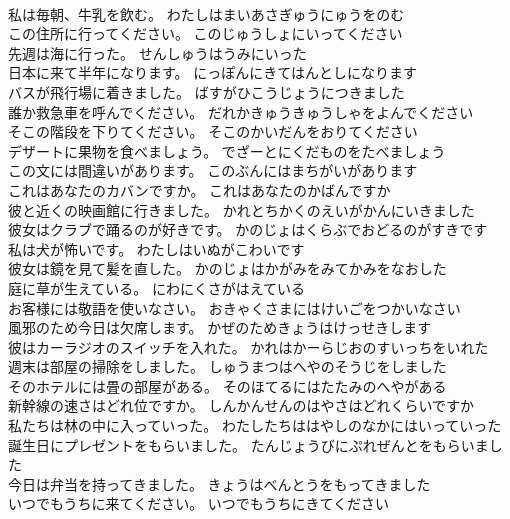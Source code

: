 \documentclass[8pt]{extreport}
\begin{document}
\begin{CJK}{UTF8}{min}
\\	私は毎朝、牛乳を飲む。	わたしはまいあさぎゅうにゅうをのむ 
\\	この住所に行ってください。	このじゅうしょにいってください 
\\	先週は海に行った。	せんしゅうはうみにいった 
\\	日本に来て半年になります。	にっぽんにきてはんとしになります 
\\	バスが飛行場に着きました。	ばすがひこうじょうにつきました 
\\	誰か救急車を呼んでください。	だれかきゅうきゅうしゃをよんでください 
\\	そこの階段を下りてください。	そこのかいだんをおりてください 
\\	デザートに果物を食べましょう。	でざーとにくだものをたべましょう 
\\	この文には間違いがあります。	このぶんにはまちがいがあります 
\\	これはあなたのカバンですか。	これはあなたのかばんですか 
\\	彼と近くの映画館に行きました。	かれとちかくのえいがかんにいきました 
\\	彼女はクラブで踊るのが好きです。	かのじょはくらぶでおどるのがすきです 
\\	私は犬が怖いです。	わたしはいぬがこわいです 
\\	彼女は鏡を見て髪を直した。	かのじょはかがみをみてかみをなおした 
\\	庭に草が生えている。	にわにくさがはえている 
\\	お客様には敬語を使いなさい。	おきゃくさまにはけいごをつかいなさい 
\\	風邪のため今日は欠席します。	かぜのためきょうはけっせきします 
\\	彼はカーラジオのスイッチを入れた。	かれはかーらじおのすいっちをいれた 
\\	週末は部屋の掃除をしました。	しゅうまつはへやのそうじをしました 
\\	そのホテルには畳の部屋がある。	そのほてるにはたたみのへやがある 
\\	新幹線の速さはどれ位ですか。	しんかんせんのはやさはどれくらいですか 
\\	私たちは林の中に入っていった。	わたしたちははやしのなかにはいっていった 
\\	誕生日にプレゼントをもらいました。	たんじょうびにぷれぜんとをもらいました 
\\	今日は弁当を持ってきました。	きょうはべんとうをもってきました 
\\	いつでもうちに来てください。	いつでもうちにきてください 

\end{CJK}
\end{document}
